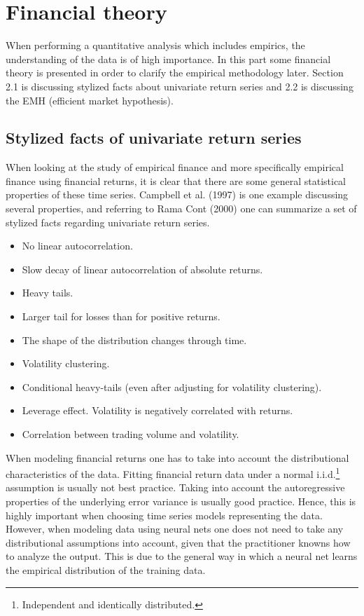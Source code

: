 \documentclass[12pt, letterpaper]{amsart}%
\begin{document}
\section{Financial theory}
When performing a quantitative analysis which includes empirics, the understanding of the data is of high importance. In this part some financial theory is presented in order to clarify the empirical methodology later. Section 2.1 is discussing stylized facts about univariate return series and 2.2 is discussing the EMH (efficient market hypothesis).

\subsection{Stylized facts of univariate return series}
When looking at the study of empirical finance and more specifically empirical finance using financial returns, it is clear that there are some general statistical properties of these time series. Campbell et al. (1997) is one example discussing several properties, and referring to Rama Cont (2000) one can summarize a set of stylized facts regarding univariate return series.
\\

\begin{itemize}  
\item No linear autocorrelation.
\item Slow decay of linear autocorrelation of absolute returns.
\item Heavy tails.
\item Larger tail for losses than for positive returns.
\item The shape of the distribution changes through time.
\item Volatility clustering.
\item Conditional heavy-tails (even after adjusting for volatility clustering).
\item Leverage effect. Volatility is negatively correlated with returns.
\item Correlation between trading volume and volatility.
\end{itemize}
\vspace{0.5cm}

When modeling financial returns one has to take into account the distributional characteristics of the data. Fitting financial return data under a normal i.i.d.\footnote{Independent and identically distributed.} assumption is usually not best practice. Taking into account the autoregressive properties of the underlying error variance is usually good practice. Hence, this is highly important when choosing time series models representing the data. However, when modeling data using neural nets one does not need to take any distributional assumptions into account, given that the practitioner knowns how to analyze the output. This is due to the general way in which a neural net learns the empirical distribution of the training data.
\end{document}
